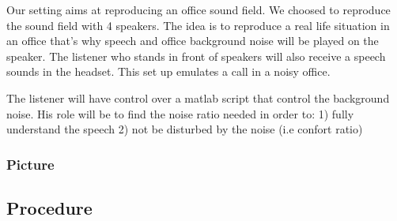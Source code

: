 Our setting aims at reproducing an office sound field. We choosed to reproduce the sound field with 4 speakers. 
The idea is to reproduce a real life situation in an office that's why speech and office background noise will be played on the speaker. 
The listener who stands in front of speakers will also receive a speech sounds in the headset. This set up emulates a call in a noisy office.

The listener will have control over a matlab script that control the background noise. His role will be to find the noise ratio needed in order to: 1) fully understand the speech 2) not be disturbed by the noise (i.e confort ratio)

\subsubsection{Picture}
\vspace{1cm}
\subsection{Procedure}


